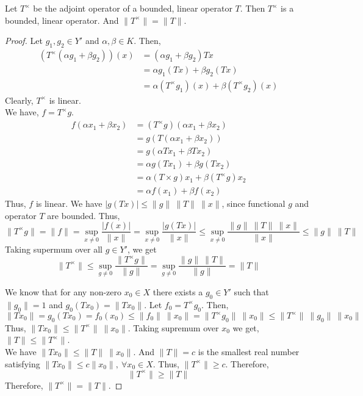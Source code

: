 \begin{theorem}[norm]
	Let $T^\times$ be the adjoint operator of a bounded, linear operator $T$.
	Then $T^\times$ is a bounded, linear operator.
	And $\|T^\times\| = \|T\|$.
\end{theorem}
\begin{proof}
	Let $g_1,g_2 \in Y'$ and $\alpha,\beta \in K$.
	Then,
	\begin{align*}
		\left(T^\times (\alpha g_1 + \beta g_2) \right)(x)
		& = (\alpha g_1 + \beta g_2) Tx \\
		& = \alpha g_1(Tx) + \beta g_2(Tx) \\
		& = \alpha (T^\times g_1)(x) + \beta (T^\times g_2)(x)
	\end{align*}
	Clearly, $T^\times$ is linear.\\

	We have, $f = T^\times g$.
	\begin{align*}
		f(\alpha x_1 + \beta x_2)
		& = (T^\times g)(\alpha x_1 + \beta x_2) \\
		& = g(T(\alpha x_1 + \beta x_2)) \\
		& = g(\alpha Tx_1 + \beta Tx_2) \\
		& = \alpha g(Tx_1) + \beta g(Tx_2) \\
		& = \alpha (T\times g)x_1 + \beta (T^\times g)x_2 \\
		& = \alpha f(x_1) + \beta f(x_2)
	\end{align*}
	Thus, $f$ is linear.
	We have $|g(Tx)| \le \|g\| \ \|T\| \ \|x\|$, since functional $g$ and operator $T$ are bounded.
	Thus,
	\[ \|T^\times g \| = \|f\| = \sup_{x \ne 0} \frac{|f(x)|}{\|x\|} = \sup_{x \ne 0} \frac{|g(Tx)|}{\|x\|} \le \sup_{x \ne 0} \frac{\|g\| \ \|T\| \ \|x\|}{\|x\|} \le \|g\| \ \|T\| \]
	Taking supermum over all $g \in Y'$, we get
	\[ \|T^\times\| \le \sup_{g \ne 0} \frac{\|T^\times g\|}{\|g\|} = \sup_{g \ne 0} \frac{\|g\| \ \|T\|}{\|g\|} = \|T\| \]
	
	We know that for any non-zero $x_0 \in X$ there exists a $g_0 \in Y'$ such that $\|g_0\| = 1$ and $g_0(Tx_0) = \|Tx_0\|$.
	Let $f_0 = T^\times g_0$.
	Then,
	\[ \|Tx_0\| = g_0(Tx_0) = f_0(x_0) \le \|f_0\| \ \|x_0\| = \|T^\times g_0\| \ \|x_0\| \le \|T^\times\| \ \|g_0\| \ \|x_0\| \]
	Thus, $\|Tx_0\| \le \|T^\times\| \ \|x_0\|$.
	Taking supremum over $x_0$ we get, $\|T\| \le \|T^\times\|$.\\

	We have $\|Tx_0\| \le \|T\|\ \|x_0\|$.
	And $\|T\| = c$ is the smallest real number satisfying $\|Tx_0\| \le c\|x_0\|,\ \forall x_0 \in X$.
	Thus, $\|T^\times\| \ge c$.
	Therefore,
	\[ \|T^\times\| \ge \|T\| \]
	Therefore, $\|T^\times\| = \|T\|$.
\end{proof}

